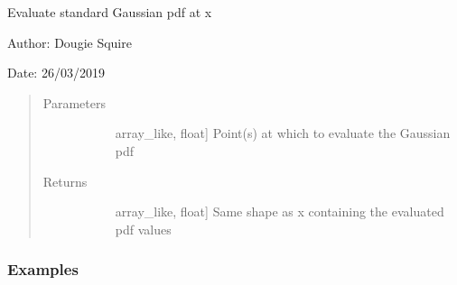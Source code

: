 \documentclass[letterpaper,10pt,english]{sphinxmanual}
\begin{document}

\begin{fulllineitems}
\label{\detokenize{utils_doc:utils.Gaussian_pdf}}
Evaluate standard Gaussian pdf at x

\begin{DUlineblock}{0em}
\item[] Author: Dougie Squire
\item[] Date: 26/03/2019
\end{DUlineblock}
\begin{quote}\begin{description}
\item[{Parameters}] \leavevmode\begin{description}
\item[{}] \leavevmode{[}array\_like, float{]}
Point(s) at which to evaluate the Gaussian pdf

\end{description}

\item[{Returns}] \leavevmode\begin{description}
\item[{}] \leavevmode{[}array\_like, float{]}
Same shape as x containing the evaluated pdf values

\end{description}

\end{description}\end{quote}
\subsubsection*{Examples}

\begin{sphinxVerbatim}[commandchars=\\\{\}]
\end{sphinxVerbatim}

\end{fulllineitems}

\end{document}
